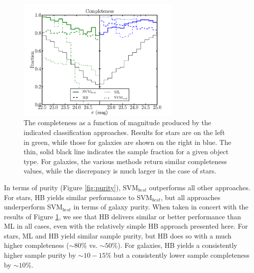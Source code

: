 \documentclass[12pt,preprint]{aastex}
\begin{document}
\begin{figure}
\centering
 \includegraphics[clip=true, trim=0cm 0cm 0.0cm 0.cm,width=8cm]{fig3.pdf}
\caption{The completeness as a function of magnitude produced by the
  indicated classification approaches.  Results for stars are on the
  left in green, while those for galaxies are shown on the right in
  blue.  The thin, solid black line indicates the sample fraction for
  a given object type.  For galaxies, the various methods return
  similar completeness values, while the discrepancy is much larger in
  the case of stars.}
\label{fig:completeness}
\end{figure}


In terms of purity (Figure \ref{fig:purity}), SVM$_{best}$ outperforms
all other approaches.  For stars, HB yields similar performance to
SVM$_{best}$, but all approaches underperform SVM$_{best}$ in terms of
galaxy purity.  When taken in concert with the results of Figure
\ref{fig:completeness}, we see that HB delivers similar or better
performance than ML in all cases, even with the relatively simple HB
approach presented here.  For stars, ML and HB yield similar sample
purity, but HB does so with a much higher completeness ($\sim 80\%$
vs. $\sim 50\%$).  For galaxies, HB yields a consistently higher
sample purity by $\sim 10-15\%$ but a consistently lower sample
completeness by $\sim10\%$.
\end{document}
